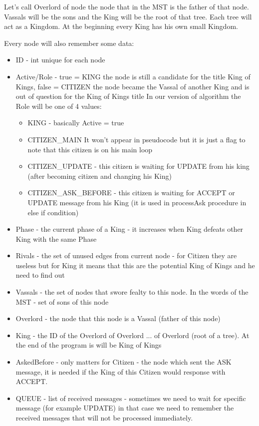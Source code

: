 \documentclass{article}
\begin{document}
Let's call Overlord of node the node that in the MST is the father of that node. Vassals will be the sons and the King will be the root of that tree. Each tree will act as a Kingdom. At the beginning every King has his own small Kingdom.

Every node will also remember some data:
\begin{itemize}
    \item ID - int unique for each node
    \item Active/Role - true = KING the node is still a candidate for the title King of Kings, false = CITIZEN the node became the Vassal of another King and is out of question for the King of Kings title
    In our version of algorithm the Role will be one of 4 values:
    \begin{itemize}
        \item KING - basically Active = true
        \item CITIZEN\_MAIN It won't appear in pseudocode but it is just a flag to note that this citizen is on his main loop
        \item CITIZEN\_UPDATE - this citizen is waiting for UPDATE from his king (after becoming citizen and changing his King)
        \item CITIZEN\_ASK\_BEFORE - this citizen is waiting for ACCEPT or UPDATE message from his King (it is used in processAsk procedure in else if condition)
    \end{itemize}
    \item Phase - the current phase of a King - it increases when King defeats other King with the same Phase
    \item Rivals - the set of unused edges from current node - for Citizen they are useless but for King it means that this are the potential King of Kings and he need to find out
    \item Vassals - the set of nodes that swore fealty to this node. In the words of the MST - set of sons of this node
    \item Overlord - the node that this node is a Vassal (father of this node)
    \item King - the ID of the Overlord of Overlord ... of Overlord (root of a tree). At the end of the program is will be King of Kings
    \item AskedBefore - only matters for Citizen - the node which sent the ASK message, it is needed if the King of this Citizen would response with ACCEPT.
    \item QUEUE - list of received messages - sometimes we need to wait for specific message (for example UPDATE) in that case we need to remember the received messages that will not be processed immediately.
\end{itemize}
\end{document}
